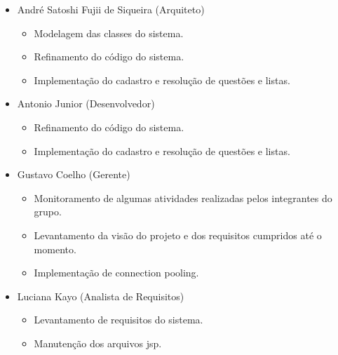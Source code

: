 \documentclass[12pt,letterpaper]{article}
\begin{document}
\begin{itemize}

\item {}André Satoshi Fujii de Siqueira (Arquiteto)\\
\vspace{-0.5cm}
\begin{itemize}
\item{}Modelagem das classes do sistema.\\
\item{}Refinamento do código do sistema.\\
\item{}Implementação do cadastro e resolução de questões e listas.
\end{itemize}
\vspace{0.5cm}

\item {}Antonio Junior (Desenvolvedor)\\
\vspace{-0.5cm}
\begin{itemize}
\item{}Refinamento do código do sistema.\\
\item{}Implementação do cadastro e resolução de questões e listas.
\end{itemize}
\vspace{0.5cm}

\item {}Gustavo Coelho (Gerente)\\
\vspace{-0.5cm}
\begin{itemize}
\item{}Monitoramento de algumas atividades realizadas pelos integrantes do grupo.\\
\item{}Levantamento da visão do projeto e dos requisitos cumpridos até o momento.\\
\item{}Implementação de connection pooling.
\end{itemize}
\vspace{0.5cm}

\item {}Luciana Kayo (Analista de Requisitos)\\
\vspace{-0.5cm}
\begin{itemize}
\item{}Levantamento de requisitos do sistema.\\
\item{}Manutenção dos arquivos jsp.
\end{itemize}
\vspace{0.5cm}


\end{itemize}
\end{document}

